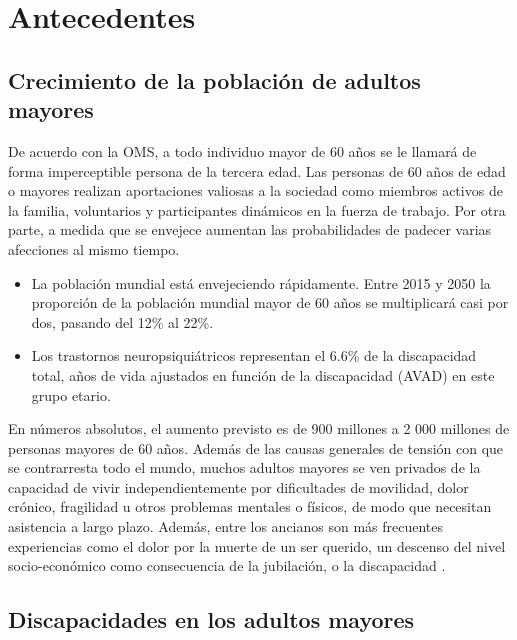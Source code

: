 \section{Antecedentes}
\subsection{Crecimiento de la población de adultos mayores}

De acuerdo con la OMS, a todo individuo mayor de 60 años se le llamará de forma imperceptible persona de la tercera edad. Las personas de 60 años de edad o mayores realizan aportaciones valiosas a la sociedad como miembros activos de la familia, voluntarios y participantes dinámicos en la fuerza de trabajo. Por otra parte, a medida que se envejece aumentan las probabilidades de padecer varias afecciones al mismo tiempo. \\

\begin{itemize}
	\item La población mundial está envejeciendo rápidamente. Entre 2015 y 2050 la proporción de la población mundial mayor de 60 años se multiplicará casi por dos, pasando del 12\% al 22\%.
	\item Los trastornos neuropsiquiátricos representan el 6.6\% de la discapacidad total, años de vida ajustados en función de la discapacidad (AVAD) en este grupo etario.
\end{itemize}

En números absolutos, el aumento previsto es de 900 millones a 2 000 millones de personas mayores de 60 años. Además de las causas generales de tensión con que se contrarresta todo el mundo, muchos adultos mayores se ven privados de la capacidad de vivir independientemente por dificultades de movilidad, dolor crónico, fragilidad u otros problemas mentales o físicos, de modo que necesitan asistencia a largo plazo. Además, entre los ancianos son más frecuentes experiencias como el dolor por la muerte de un ser querido, un descenso del nivel socio-económico como consecuencia de la jubilación, o la discapacidad \cite{cuatro}.

\subsection{Discapacidades en los adultos mayores}

